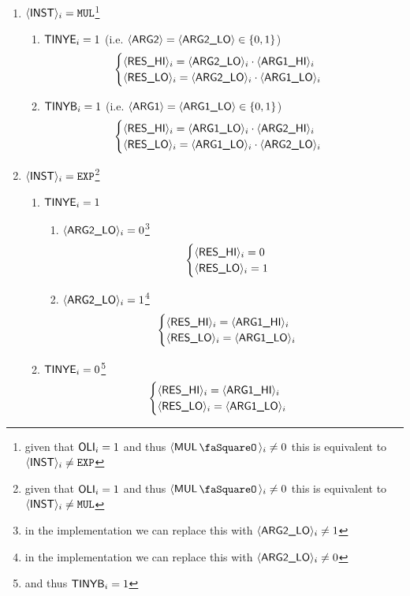 \begin{enumerate}
	\item \If $\iInst_{i} = \inst{MUL}$\footnote{given that $\oli_{i} = 1$ and thus $\iMulStamp_{i} \neq 0$ this is equivalent to $\iInst_{i} \neq \inst{EXP}$} \Then
	\begin{enumerate}
		\item \If $\tinyExponent_{i} = 1$ (i.e. $\iArgTwo = \iArgTwoLo \in \{ 0, 1 \}$) \Then
		\[
		\begin{cases}
			\iResHi_{i} = \iArgTwoLo_{i} \cdot \iArgOneHi_{i} \\
			\iResLo_{i} = \iArgTwoLo_{i} \cdot \iArgOneLo_{i} \\
		\end{cases}
		\]
		\item \If $\tinyBase_{i} = 1$ (i.e. $\iArgOne = \iArgOneLo \in \{ 0, 1 \}$) \Then
		\[
		\begin{cases}
			\iResHi_{i} = \iArgOneLo_{i} \cdot \iArgTwoHi_{i} \\
			\iResLo_{i} = \iArgOneLo_{i} \cdot \iArgTwoLo_{i} \\
		\end{cases}
		\]
	\end{enumerate}
	\item \If $\iInst_{i} = \inst{EXP}$\footnote{given that $\oli_{i} = 1$ and thus $\iMulStamp_{i} \neq 0$ this is equivalent to $\iInst_{i} \neq \inst{MUL}$} \Then
	\begin{enumerate}
		\item \If $\tinyExponent_{i} = 1$ \Then
		\begin{enumerate}
			\item \If $\iArgTwoLo_{i} = 0$\footnote{in the implementation we can replace this with \If $\iArgTwoLo_{i} \neq 1$} \Then 
			\[
			\begin{cases}
				\iResHi_{i} = 0 \\
				\iResLo_{i} = 1 \\
			\end{cases}
			\]
			\item \If $\iArgTwoLo_{i} = 1$\footnote{in the implementation we can replace this with \If $\iArgTwoLo_{i} \neq 0$} \Then 
			\[
			\begin{cases}
				\iResHi_{i} = \iArgOneHi_{i} \\
				\iResLo_{i} = \iArgOneLo_{i} \\
			\end{cases}
			\]
		\end{enumerate}
		\item \If $\tinyExponent_{i} = 0$\footnote{and thus $\tinyBase_{i} = 1$} \Then
		\[
		\begin{cases}
			\iResHi_{i} = \iArgOneHi_{i} \\
			\iResLo_{i} = \iArgOneLo_{i} \\
		\end{cases}
		\]
	\end{enumerate}
\end{enumerate}